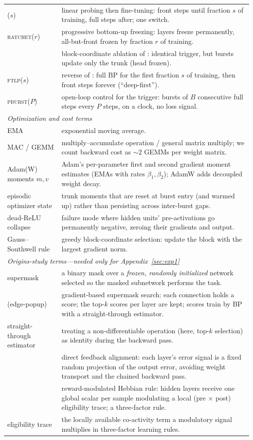 {\begin{longtable}{p{}p{}}
\lpft{}($s$) & linear probing then fine-tuning: front steps until fraction
$s$ of training, full steps after; one switch. \\
\textsc{ratchet}($r$) & progressive bottom-up freezing: layers freeze
permanently, all-but-front frozen by fraction $r$ of training. \\
\bcd{} & block-coordinate ablation of \fw{}: identical trigger, but bursts
update only the trunk (head frozen). \\
\textsc{ftlp}($s$) & reverse of \lpft{}: full BP for the first fraction $s$
of training, then front steps forever (``deep-first''). \\
\textsc{pburst}($P$) & open-loop control for the trigger: bursts of $B$
consecutive full steps every $P$ steps, on a clock, no loss signal. \\
\midrule
\multicolumn{2}{l}{\emph{Optimization and cost terms}} \\
\midrule
EMA & exponential moving average. \\
MAC / GEMM & multiply--accumulate operation / general matrix multiply; we
count backward cost as ${\sim}2$ GEMMs per weight matrix. \\
Adam(W) moments $m, v$ & Adam's per-parameter first and second gradient
moment estimates (EMAs with rates $\beta_1, \beta_2$); AdamW adds decoupled
weight decay. \\
episodic optimizer state & trunk moments that are reset at burst entry (and
warmed up) rather than persisting across inter-burst gaps. \\
dead-ReLU collapse & failure mode where hidden units' pre-activations go
permanently negative, zeroing their gradients and output. \\
Gauss--Southwell rule & greedy block-coordinate selection: update the block
with the largest gradient norm. \\
\midrule
\multicolumn{2}{l}{\emph{Origins-study terms---needed only for Appendix~\ref{sec:exp1}}} \\
\midrule
supermask & a binary mask over a \emph{frozen, randomly initialized}
network selected so the masked subnetwork performs the task. \\
\ep{} (edge-popup) & gradient-based supermask search: each connection holds
a score; the top-$k$ scores per layer are kept; scores train by BP with a
straight-through estimator. \\
straight-through estimator & treating a non-differentiable operation (here,
top-$k$ selection) as identity during the backward pass. \\
\dfa{} & direct feedback alignment: each layer's error signal is a fixed
random projection of the output error, avoiding weight transport and the
chained backward pass. \\
\rmhebb{} & reward-modulated Hebbian rule: hidden layers receive one global
scalar per sample modulating a local (pre $\times$ post) eligibility trace;
a three-factor rule. \\
eligibility trace & the locally available co-activity term a modulatory
signal multiplies in three-factor learning rules. \\
\bottomrule
\end{longtable}}
